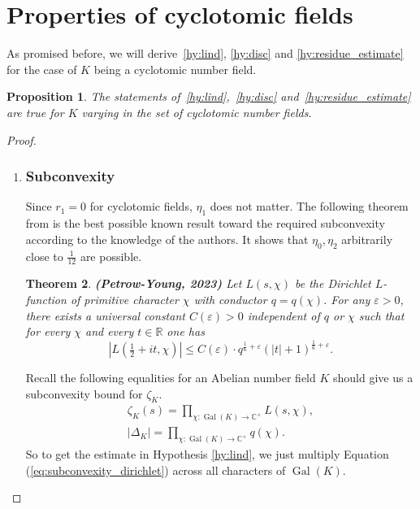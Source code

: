 \documentclass[a4paper]{article}
\newtheorem{theorem}{Theorem}
\newtheorem{proposition}[theorem]{Proposition}
\theoremstyle{definition}
\theoremstyle{remark}
\DeclareMathOperator{\Gal}{Gal}
\begin{document}
\section{Properties of cyclotomic fields}

\label{se:cyclo_satisfy}

As promised before, we will derive~\cref{hy:lind},
\ref{hy:disc} and \ref{hy:residue_estimate} for the case of $K$ being a cyclotomic number field.
\begin{proposition}
The statements of~\cref{hy:lind},~\cref{hy:disc} and~\cref{hy:residue_estimate} are true for $K$ varying in the set of cyclotomic number fields.
\end{proposition}
\begin{proof}
\begin{enumerate}

    \item 
\subsubsection*{Subconvexity}


Since $r_{1}=0$ for cyclotomic fields, $\eta_{1}$ does not matter.
The following theorem
from \cite{PY23} is the best possible known result toward the required subconvexity
according to the knowledge of the authors.
It shows that $\eta_0,\eta_2$ arbitrarily close to $\tfrac{1}{12}$ are possible. 
\begin{theorem}
\label{th:subconvex_dirichlet} 
{\bf (Petrow-Young, 2023)}
Let $L(s,\chi)$ be the Dirichlet $L$-function of primitive character $\chi$ with conductor $q=q(\chi)$. 
For any $\varepsilon > 0$, there exists a universal constant $C(\varepsilon) > 0$ independent of $q$ or $\chi$
such that for every $\chi$ and every $t \in \mathbb{R}$ one has 
\begin{equation}
|L(\tfrac{1}{2}+it,\chi) | \leq C(\varepsilon) \cdot q^{\frac{1}{6} + \varepsilon}(|t|+1)^{\frac{1}{6}+ \varepsilon} .
\label{eq:subconvexity_dirichlet}
\end{equation}
\end{theorem}

Recall the following equalities for an Abelian number field $K$ should give us a subconvexity bound for $\zeta_K$.
\begin{align}
\zeta_K(s) = \prod_{\chi: \Gal(K) \rightarrow \mathbb{C}^{\times}} L(s,\chi), \\
|\Delta_K| = \prod_{\chi: \Gal(K) \rightarrow \mathbb{C}^{\times}} q(\chi).
\end{align}
So to get the estimate in Hypothesis \ref{hy:lind}, we just multiply 
Equation (\ref{eq:subconvexity_dirichlet}) across all characters of $\Gal(K)$.




\end{enumerate}
\end{proof}
\end{document}
